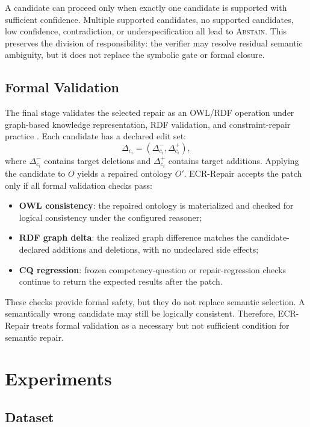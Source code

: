 \documentclass[conference]{IEEEtran}
\begin{document}
A candidate can proceed only when exactly one candidate is supported with sufficient confidence. Multiple supported candidates, no supported candidates, low confidence, contradiction, or underspecification all lead to \textsc{Abstain}. This preserves the division of responsibility: the verifier may resolve residual semantic ambiguity, but it does not replace the symbolic gate or formal closure.

\subsection{Formal Validation}

The final stage validates the selected repair as an OWL/RDF operation under graph-based knowledge representation, RDF validation, and constraint-repair practice \cite{hogan2021knowledgegraphs,ahmetaj2022shacl,ahmetaj2025shacl}. Each candidate has a declared edit set:
\[
\Delta_{c_i}=(\Delta^-_{c_i},\Delta^+_{c_i}),
\]
where $\Delta^-_{c_i}$ contains target deletions and $\Delta^+_{c_i}$ contains target additions. Applying the candidate to $O$ yields a repaired ontology $O'$. ECR-Repair accepts the patch only if all formal validation checks pass:
\begin{itemize}
    \item \textbf{OWL consistency}: the repaired ontology is materialized and checked for logical consistency under the configured reasoner;
    \item \textbf{RDF graph delta}: the realized graph difference matches the candidate-declared additions and deletions, with no undeclared side effects;
    \item \textbf{CQ regression}: frozen competency-question or repair-regression checks continue to return the expected results after the patch.
\end{itemize}

These checks provide formal safety, but they do not replace semantic selection. A semantically wrong candidate may still be logically consistent. Therefore, ECR-Repair treats formal validation as a necessary but not sufficient condition for semantic repair.

\section{Experiments}

\subsection{Dataset}
\end{document}
